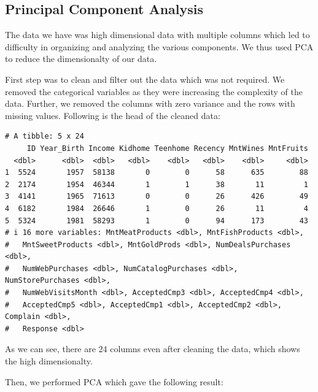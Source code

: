 \documentclass[
  a4paperpaper,
  DIV=11,
  numbers=noendperiod]{scrartcl}
\begin{document}
\hypertarget{principal-component-analysis-1}{%
\subsection{Principal Component
Analysis}\label{principal-component-analysis-1}}

The data we have was high dimensional data with multiple columns which
led to difficulty in organizing and analyzing the various components. We
thus used PCA to reduce the dimensionalty of our data.

First step was to clean and filter out the data which was not required.
We removed the categorical variables as they were increasing the
complexity of the data. Further, we removed the columns with zero
variance and the rows with missing values. Following is the head of the
cleaned data:

\begin{verbatim}
# A tibble: 5 x 24
     ID Year_Birth Income Kidhome Teenhome Recency MntWines MntFruits
  <dbl>      <dbl>  <dbl>   <dbl>    <dbl>   <dbl>    <dbl>     <dbl>
1  5524       1957  58138       0        0      58      635        88
2  2174       1954  46344       1        1      38       11         1
3  4141       1965  71613       0        0      26      426        49
4  6182       1984  26646       1        0      26       11         4
5  5324       1981  58293       1        0      94      173        43
# i 16 more variables: MntMeatProducts <dbl>, MntFishProducts <dbl>,
#   MntSweetProducts <dbl>, MntGoldProds <dbl>, NumDealsPurchases <dbl>,
#   NumWebPurchases <dbl>, NumCatalogPurchases <dbl>, NumStorePurchases <dbl>,
#   NumWebVisitsMonth <dbl>, AcceptedCmp3 <dbl>, AcceptedCmp4 <dbl>,
#   AcceptedCmp5 <dbl>, AcceptedCmp1 <dbl>, AcceptedCmp2 <dbl>, Complain <dbl>,
#   Response <dbl>
\end{verbatim}

As we can see, there are 24 columns even after cleaning the data, which
shows the high dimensionalty.

Then, we performed PCA which gave the following result:
\end{document}

